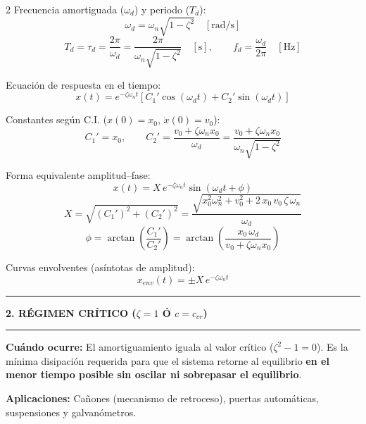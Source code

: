 \documentclass[10pt,a4paper]{article}
\newcommand{\seccion}[1]{%
  \vspace{1.5mm}\hrule\vspace{1mm}%
  \textbf{\footnotesize\MakeUppercase{#1}}\vspace{1mm}\hrule\vspace{1.5mm}}
\begin{document}
\begin{multicols}{2}
Frecuencia amortiguada ($\omega_d$) y periodo ($T_d$):
\begin{equation*}
  \omega_d = \omega_n\sqrt{1-\zeta^{2}} \quad [\mathrm{rad/s}]
\end{equation*}
\begin{equation*}
  T_d = \tau_d = \frac{2\pi}{\omega_d} = \frac{2\pi}{\omega_n\sqrt{1-\zeta^{2}}} \quad [\mathrm{s}],
  \qquad
  f_d = \frac{\omega_d}{2\pi} \quad [\mathrm{Hz}]
\end{equation*}

Ecuación de respuesta en el tiempo:
\begin{equation*}
  x(t) = e^{-\zeta\omega_n t}\left[ C_1'\cos(\omega_d t) + C_2'\sin(\omega_d t) \right]
\end{equation*}

Constantes según C.I. ($x(0)=x_0$, $\dot{x}(0)=v_0$):
\begin{equation*}
  C_1' = x_0,
  \qquad
  C_2' = \frac{v_0 + \zeta\omega_n x_0}{\omega_d} = \frac{v_0 + \zeta\omega_n x_0}{\omega_n\sqrt{1-\zeta^2}}
\end{equation*}

Forma equivalente amplitud--fase:
\begin{equation*}
  x(t) = X\,e^{-\zeta\omega_n t}\sin(\omega_d t + \phi)
\end{equation*}
\begin{equation*}
  X = \sqrt{(C_1')^{2} + (C_2')^{2}} = \frac{\sqrt{x_0^{2}\omega_n^{2} + v_0^{2} + 2\,x_0\,v_0\,\zeta\,\omega_n}}{\omega_d}
\end{equation*}
\begin{equation*}
  \phi = \arctan\!\left(\frac{C_1'}{C_2'}\right) = \arctan\!\left(\frac{x_0\,\omega_d}{v_0 + \zeta\omega_n x_0}\right)
\end{equation*}

Curvas envolventes (asíntotas de amplitud):
\begin{equation*}
  x_{env}(t) = \pm X\,e^{-\zeta\omega_n t}
\end{equation*}

\seccion{2. Régimen Crítico ($\zeta = 1$ ó $c = c_{cr}$)}

\textbf{Cuándo ocurre:}
El amortiguamiento iguala al valor crítico ($\zeta^2-1 = 0$). Es la mínima disipación requerida para que el sistema retorne al equilibrio \textbf{en el menor tiempo posible sin oscilar ni sobrepasar el equilibrio}.

\textbf{Aplicaciones:} Cañones (mecanismo de retroceso), puertas automáticas, suspensiones y galvanómetros.


\end{multicols}
\end{document}
